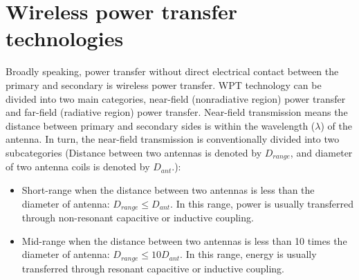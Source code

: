 \section{Wireless power transfer technologies}

Broadly speaking, power transfer without direct electrical contact between the primary and secondary is wireless power transfer. WPT technology can be divided into two main categories, near-field (nonradiative region) power transfer and far-field (radiative region) power transfer.
Near-field transmission means the distance between primary and secondary sides is within the wavelength ($\lambda$) of the antenna. In turn, the near-field transmission is conventionally divided into two subcategories \cite{Wikipedia2021, Chun} (Distance between two antennas is denoted by $D_{range}$, and diameter of two antenna coils is denoted by $D_{ant}$.):
\begin{itemize}
    \item  Short-range when the distance between two antennas is less than the diameter of antenna: $D_{range} \leq D_{ant}$.
          In this range, power is usually transferred through non-resonant capacitive or inductive coupling.
    \item Mid-range when the distance between two antennas is less than 10 times the diameter of antenna:  $D_{range} \leq 10 D_{ant}$.
          In this range, energy is usually transferred through resonant capacitive or inductive coupling.
\end{itemize}

\begin{table}[!t]
    \centering
    \caption{The different wireless power transmission technologies.}
    \label{table:differentWPT}
\end{table}


